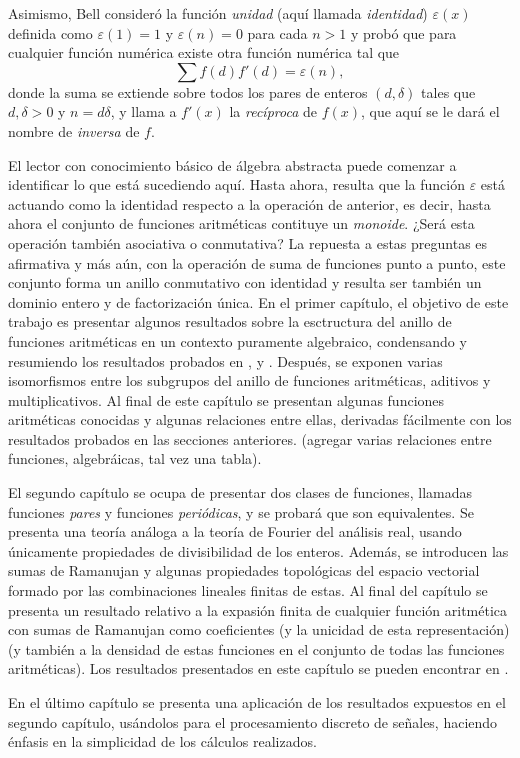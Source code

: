 Asimismo, Bell consideró la función \textit{unidad} (aquí llamada \emph{identidad}) $\varepsilon(x)$ definida como $\varepsilon(1)=1$ y $\varepsilon(n)=0$ para cada $n>1$ y probó que para cualquier función numérica existe otra función numérica tal que
\begin{equation*}
    \sum f(d) f'(d) = \varepsilon(n) \tag{$n=1,2,3,\ldots$},
\end{equation*}
donde la suma se extiende sobre todos los pares de enteros $(d,\delta)$ tales que $d,\delta >0$ y $n = d \delta$, y llama a $f'(x)$ la \textit{recíproca} de $f(x)$, que aquí se le dará el nombre de \textit{inversa} de $f$.
\bigskip

El lector con conocimiento básico de álgebra abstracta puede comenzar a identificar lo que está sucediendo aquí. Hasta ahora, resulta que la función $\varepsilon$ está actuando como la identidad respecto a la operación de anterior, es decir, hasta ahora el conjunto de funciones aritméticas contituye un \emph{monoide}. ¿Será esta operación también asociativa o conmutativa? La repuesta a estas preguntas es afirmativa y más aún, con la operación de suma de funciones punto a punto, este conjunto forma un anillo conmutativo con identidad y resulta ser también un dominio entero y de factorización única. En el primer capítulo, el objetivo de este trabajo es presentar algunos resultados sobre la esctructura del anillo de funciones aritméticas en un contexto puramente algebraico, condensando y resumiendo los resultados probados en \cite{Ca1959}, \cite{Nish1} y \cite{Bell1}. Después, se exponen varias isomorfismos entre los subgrupos del anillo de funciones aritméticas, aditivos y multiplicativos. Al final de este capítulo se presentan algunas funciones aritméticas conocidas y algunas relaciones entre ellas, derivadas fácilmente con los resultados probados en las secciones anteriores. (agregar varias relaciones entre funciones, algebráicas, tal vez una tabla).
\bigskip

El segundo capítulo se ocupa de presentar dos clases de funciones, llamadas funciones \emph{pares} y funciones \emph{periódicas}, y se probará que son equivalentes. Se presenta una teoría análoga a la teoría de Fourier del análisis real, usando únicamente propiedades de divisibilidad de los enteros. Además, se introducen las sumas de Ramanujan y algunas propiedades topológicas del espacio vectorial formado por las combinaciones lineales finitas de estas. Al final del capítulo se presenta un resultado relativo a la expasión finita de cualquier función aritmética con sumas de Ramanujan como coeficientes (y la unicidad de esta representación) (y también a la densidad de estas funciones en el conjunto de todas las funciones aritméticas). Los resultados presentados en este capítulo se pueden encontrar en \cite{Coh1}.
\bigskip

En el último capítulo se presenta una aplicación de los resultados expuestos en el segundo capítulo, usándolos para el procesamiento discreto de señales, haciendo énfasis en la simplicidad de los cálculos realizados.
